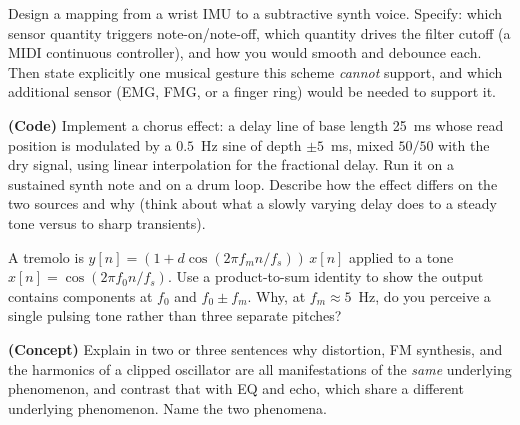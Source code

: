 \begin{exercise}
Design a mapping from a wrist IMU to a subtractive synth voice. Specify: which
sensor quantity triggers note-on/note-off, which quantity drives the filter
cutoff (a MIDI continuous controller), and how you would smooth and debounce
each. Then state explicitly one musical gesture this scheme \emph{cannot}
support, and which additional sensor (EMG, FMG, or a finger ring) would be needed
to support it.
\end{exercise}

\begin{exercise}
\textbf{(Code)} Implement a chorus effect: a delay line of base length 25~ms
whose read position is modulated by a $0.5$~Hz sine of depth $\pm 5$~ms, mixed
$50/50$ with the dry signal, using linear interpolation for the fractional delay.
Run it on a sustained synth note and on a drum loop. Describe how the effect
differs on the two sources and why (think about what a slowly varying delay does
to a steady tone versus to sharp transients).
\end{exercise}

\begin{exercise}
A tremolo is $y[n]=(1+d\cos(2\pi f_m n/f_s))\,x[n]$ applied to a tone
$x[n]=\cos(2\pi f_0 n/f_s)$. Use a product-to-sum identity to show the output
contains components at $f_0$ and $f_0\pm f_m$. Why, at $f_m\approx 5$~Hz, do you
perceive a single pulsing tone rather than three separate pitches?
\end{exercise}

\begin{exercise}
\textbf{(Concept)} Explain in two or three sentences why distortion, FM
synthesis, and the harmonics of a clipped oscillator are all manifestations of
the \emph{same} underlying phenomenon, and contrast that with EQ and echo, which
share a different underlying phenomenon. Name the two phenomena.
\end{exercise}
